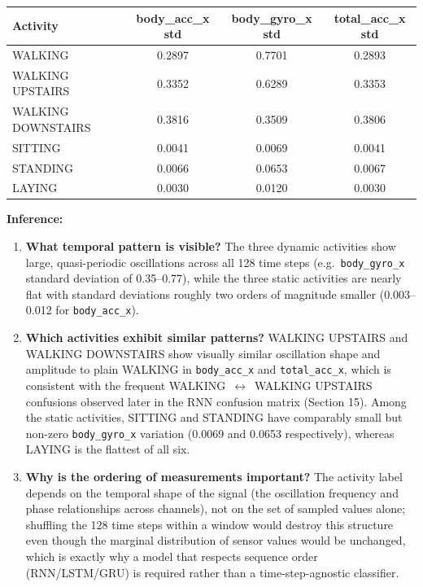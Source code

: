 \documentclass[10pt]{article}
\begin{document}
\begin{center}
\begin{tabular}{|l|c|c|c|}
\hline
Activity & body\_acc\_x std & body\_gyro\_x std & total\_acc\_x std\\
\hline
WALKING & 0.2897 & 0.7701 & 0.2893\\
WALKING UPSTAIRS & 0.3352 & 0.6289 & 0.3353\\
WALKING DOWNSTAIRS & 0.3816 & 0.3509 & 0.3806\\
SITTING & 0.0041 & 0.0069 & 0.0041\\
STANDING & 0.0066 & 0.0653 & 0.0067\\
LAYING & 0.0030 & 0.0120 & 0.0030\\
\hline
\end{tabular}
\end{center}

\textbf{Inference:}

\begin{enumerate}
\item \textbf{What temporal pattern is visible?} The three dynamic
activities show large, quasi-periodic oscillations across all 128 time
steps (e.g.\ \texttt{body\_gyro\_x} standard deviation of 0.35--0.77), while
the three static activities are nearly flat with standard deviations roughly
two orders of magnitude smaller (0.003--0.012 for \texttt{body\_acc\_x}).
\item \textbf{Which activities exhibit similar patterns?} WALKING UPSTAIRS
and WALKING DOWNSTAIRS show visually similar oscillation shape and
amplitude to plain WALKING in \texttt{body\_acc\_x} and
\texttt{total\_acc\_x}, which is consistent with the frequent
WALKING~$\leftrightarrow$~WALKING UPSTAIRS confusions observed later in the
RNN confusion matrix (Section 15). Among the static activities, SITTING and
STANDING have comparably small but non-zero \texttt{body\_gyro\_x}
variation (0.0069 and 0.0653 respectively), whereas LAYING is the flattest
of all six.
\item \textbf{Why is the ordering of measurements important?} The activity
label depends on the temporal shape of the signal (the oscillation
frequency and phase relationships across channels), not on the set of
sampled values alone; shuffling the 128 time steps within a window would
destroy this structure even though the marginal distribution of sensor
values would be unchanged, which is exactly why a model that respects
sequence order (RNN/LSTM/GRU) is required rather than a time-step-agnostic
classifier.
\end{enumerate}
\end{document}
